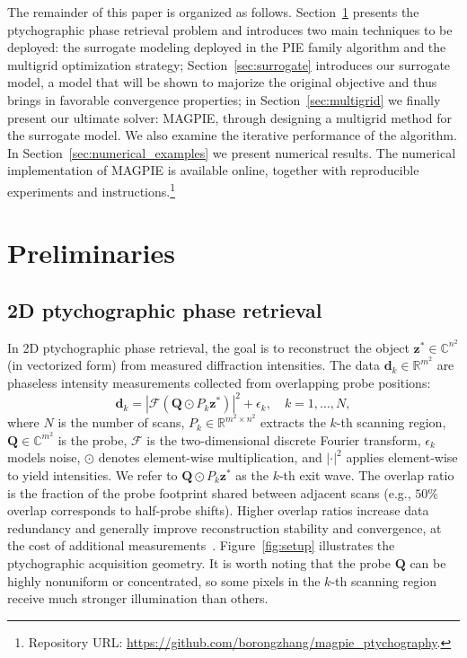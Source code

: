 \documentclass{article}
\numberwithin{equation}{section}
\begin{document}
The remainder of this paper is organized as follows. Section~\ref{sec:prelim} presents the ptychographic phase retrieval problem and introduces two main techniques to be deployed: the surrogate modeling deployed in the PIE family algorithm and the multigrid optimization strategy; Section~\ref{sec:surrogate} introduces our surrogate model, a model that will be shown to majorize the original objective and thus brings in favorable convergence properties; in Section~\ref{sec:multigrid} we finally present our ultimate solver: MAGPIE, through designing a multigrid method for the surrogate model. We also examine the iterative performance of the algorithm. In Section~\ref{sec:numerical_examples} we present numerical results. The numerical implementation of {MAGPIE} is available online, together with reproducible experiments and instructions.\footnote{Repository URL: \url{https://github.com/borongzhang/magpie_ptychography}.}
\section{Preliminaries}\label{sec:prelim}

\subsection{2D ptychographic phase retrieval} 
In 2D ptychographic phase retrieval, the goal is to reconstruct the object $\bm{z}^\ast \in \mathbb{C}^{n^2}$ (in vectorized form) from measured diffraction intensities. The data $\bm{d}_k \in \mathbb{R}^{m^2}$ are phaseless intensity measurements collected from overlapping probe positions:
\begin{equation*} \bm{d}_k = |\mathcal{F}(\bm{Q}\odot P_k \bm{z}^\ast)|^2 + \epsilon_k, \quad k = 1, \ldots, N, \end{equation*}
where $N$ is the number of scans, $P_k \in \mathbb{R}^{m^2\times n^2}$ extracts the $k$-th scanning region, $\bm{Q}\in\mathbb{C}^{m^2}$ is the probe, $\mathcal{F}$ is the two-dimensional discrete Fourier transform, $\epsilon_k$ models noise, $\odot$ denotes element-wise multiplication, and $|\cdot|^2$ applies element-wise to yield intensities. We refer to $\bm{Q}\odot P_k \bm{z}^\ast$ as the $k$-th exit wave. The overlap ratio is the fraction of the probe footprint shared between adjacent scans (e.g., $50\%$ overlap corresponds to half-probe shifts). Higher overlap ratios increase data redundancy and generally improve reconstruction stability and convergence, at the cost of additional measurements~\cite{Rodenburg2019}. Figure~\ref{fig:setup} illustrates the ptychographic acquisition geometry. It is worth noting that the probe $\bm{Q}$ can be highly nonuniform or concentrated, so some pixels in the $k$-th  scanning region receive much stronger illumination than others.
\end{document}
